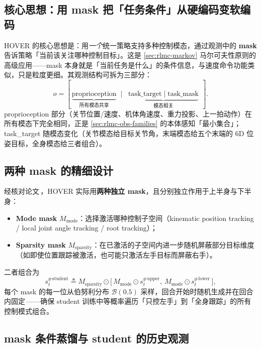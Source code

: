\subsection{核心思想：用 mask 把「任务条件」从硬编码变软编码}

HOVER 的核心思想是：用\emph{一个}统一策略支持多种控制模态，通过观测中的 \textbf{mask} 告诉策略「当前该关注哪种控制目标」。这是 \cref{sec:rlmc-markov} 马尔可夫性原则的高级应用——mask 本身就是「当前任务是什么」的条件信息，与速度命令功能类似，只是粒度更细。其观测结构可拆为三部分：
\begin{equation*}
o = [\,\underbrace{\text{proprioception}}_{\text{所有模态共享}}\;\mid\;\underbrace{\text{task\_target}\;\mid\;\text{task\_mask}}_{\text{模态相关}}\,].
\end{equation*}
proprioception 部分（关节位置/速度、机体角速度、重力投影、上一拍动作）在所有模态下完全相同，正是 \cref{sec:rlmc-obs-families} 的本体感知「最小集合」；task\_target 随模态变化（关节模态给目标关节角，末端模态给五个末端的 6D 位姿目标，全身模态给三者组合）。

\subsection{两种 mask 的精细设计}

经核对论文\,\cite{he2025hover}，HOVER 实际用\textbf{两种独立 mask}，且分别独立作用于上半身与下半身：
\begin{itemize}
  \item \textbf{Mode mask} $M_{\text{mode}}$：选择激活哪种控制子空间（kinematic position tracking / local joint angle tracking / root tracking）；
  \item \textbf{Sparsity mask} $M_{\text{sparsity}}$：在已激活的子空间内进一步随机屏蔽部分目标维度（如即使位置跟踪被激活，也可能只激活左手目标而屏蔽右手）。
\end{itemize}
二者组合为
\begin{equation}
s^{g\text{-student}}_t \triangleq M_{\text{sparsity}}\odot\big[\,M_{\text{mode}}\odot s^{g\text{-upper}}_t,\ M_{\text{mode}}\odot s^{g\text{-lower}}_t\,\big],
\label{eq:rlmc-hover-mask}
\end{equation}
每个 mask 的每一位从伯努利分布 $\mathcal B(0.5)$ 采样，回合开始时随机生成并在回合内固定\,\cite{he2025hover}——确保 student 训练中等概率遍历「只控左手」到「全身跟踪」的所有控制模式组合。

\subsection{mask 条件蒸馏与 student 的历史观测}

